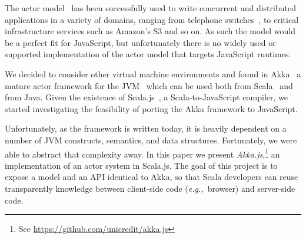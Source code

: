 \documentclass{sig-alternate}
\newcommand{\eg}{{\em e.g.,~}}
\begin{document}
The actor model~\cite{Hewitt77,Agha} has been successfully used to write concurrent and distributed applications in a variety of domains, ranging from telephone switches~\cite{ErlangApplications}, to critical infrastructure services such as Amazon's S3 and so on. As such the model would be a perfect fit for JavaScript, but unfortunately there is no widely used or supported implementation of the actor model that targets JavaScript runtimes.

We decided to consider other virtual machine environments and found in Akka~\cite{Akka} a mature actor framework for the JVM~\cite{Lindholm-Yellin} which can be used both from Scala~\cite{OderskyR14} and from Java. Given the existence of Scala.js~\cite{Scalajs}, a Scala-to-JavaScript compiler, we started investigating the feasibility of porting the Akka framework to JavaScript.

Unfortunately, as the framework is written today, it is heavily dependent on a number of JVM constructs, semantics, and data structures. Fortunately, we were able to abstract that complexity away. In this paper we present {\em Akka.js},\footnote{See \url{https://github.com/unicredit/akka.js}} an implementation of an actor system in Scala.js. The goal of this project is to expose a model and an API identical to Akka, so that Scala developers can reuse transparently knowledge between client-side code (\eg browser) and server-side code.

%
\end{document}
